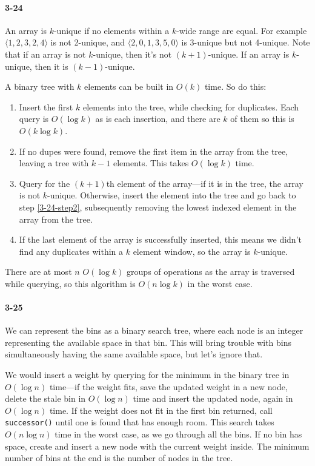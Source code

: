 \documentclass{report}
\begin{document}
\paragraph{3-24} An array is $k$-unique if no elements within a $k$-wide range are equal. For example $\langle1,2,3,2,4\rangle$ is not 2-unique, and $\langle2,0,1,3,5,0\rangle$ is 3-unique but not 4-unique. Note that if an array is not $k$-unique, then it's not $(k+1)$-unique. If an array is $k$-unique, then it is $(k-1)$-unique.

A binary tree with $k$ elements can be built in $O(k)$ time. So do this:
\begin{enumerate}[label=\arabic*)]
	\item Insert the first $k$ elements into the tree, while checking for duplicates. Each query is $O(\log k)$ as is each insertion, and there are $k$ of them so this is $O(k\log k)$.
	\item If no dupes were found, remove the first item in the array from the tree, leaving a tree with $k-1$ elements. This takes $O(\log k)$ time. \label{3-24-step2}
	\item Query for the $(k+1)$th element of the array---if it is in the tree, the array is not $k$-unique. Otherwise, insert the element into the tree and go back to step \ref{3-24-step2}, subsequently removing the lowest indexed element in the array from the tree.
	\item If the last element of the array is successfully inserted, this means we didn't find any duplicates within a $k$ element window, so the array is $k$-unique.
\end{enumerate}

There are at most $n$ $O(\log k)$ groups of operations as the array is traversed while querying, so this algorithm is $O(n\log k)$ in the worst case.

\paragraph{3-25} We can represent the bins as a binary search tree, where each node is an integer representing the available space in that bin. This will bring trouble with bins simultaneously having the same available space, but let's ignore that.

We would insert a weight by querying for the minimum in the binary tree in $O(\log n)$ time---if the weight fits, save the updated weight in a new node, delete the stale bin in $O(\log n)$ time and insert the updated node, again in $O(\log n)$ time. If the weight does not fit in the first bin returned, call \lstinline!successor()! until one is found that has enough room. This search takes $O(n\log n)$ time in the worst case, as we go through all the bins. If no bin has space, create and insert a new node with the current weight inside. The minimum number of bins at the end is the number of nodes in the tree.
\end{document}
